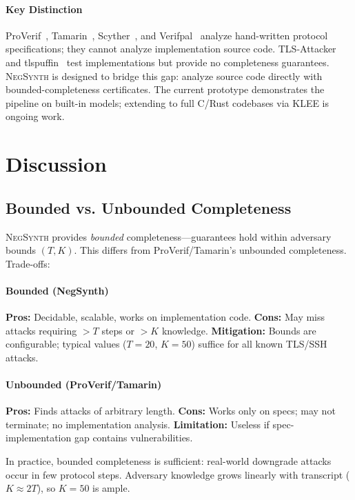 \documentclass[10pt,twocolumn]{article}
\begin{document}
\paragraph{Key Distinction}
ProVerif~\cite{blanchet2016modeling}, Tamarin~\cite{meier2013tamarin}, Scyther~\cite{cremers2008scyther}, and Verifpal~\cite{kobeissi2020verifpal} analyze hand-written protocol specifications; they cannot analyze implementation source code.  TLS-Attacker~\cite{somorovsky2016systematic} and tlspuffin~\cite{ammann2024dyfuzzing} test implementations but provide no completeness guarantees.  \textsc{NegSynth} is designed to bridge this gap: analyze source code directly with bounded-completeness certificates.  The current prototype demonstrates the pipeline on built-in models; extending to full C/Rust codebases via KLEE is ongoing work.


\section{Discussion}
\label{sec:discussion}

\subsection{Bounded vs. Unbounded Completeness}

\textsc{NegSynth} provides \emph{bounded} completeness—guarantees hold within adversary bounds $(T, K)$. This differs from ProVerif/Tamarin's unbounded completeness. Trade-offs:

\paragraph{Bounded (NegSynth)}
\textbf{Pros:} Decidable, scalable, works on implementation code. \textbf{Cons:} May miss attacks requiring $>T$ steps or $>K$ knowledge. \textbf{Mitigation:} Bounds are configurable; typical values ($T=20$, $K=50$) suffice for all known TLS/SSH attacks.

\paragraph{Unbounded (ProVerif/Tamarin)}
\textbf{Pros:} Finds attacks of arbitrary length. \textbf{Cons:} Works only on specs; may not terminate; no implementation analysis. \textbf{Limitation:} Useless if spec-implementation gap contains vulnerabilities.

In practice, bounded completeness is sufficient: real-world downgrade attacks occur in few protocol steps. Adversary knowledge grows linearly with transcript ($K \approx 2T$), so $K=50$ is ample.
\end{document}

